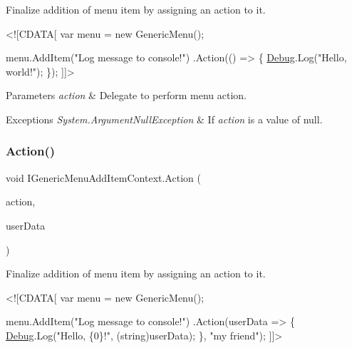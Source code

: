 Finalize addition of menu item by assigning an action to it. 


\begin{DoxyCode}
<![CDATA[
var menu = \textcolor{keyword}{new} GenericMenu();

menu.AddItem(\textcolor{stringliteral}{"Log message to console!"})
    .Action(() => \{
        \hyperlink{namespace_debug}{Debug}.Log(\textcolor{stringliteral}{"Hello, world!"});
    \});
]]>
\end{DoxyCode}
 


\begin{DoxyParams}{Parameters}
{\em action} & Delegate to perform menu action.\\
\hline
\end{DoxyParams}

\begin{DoxyExceptions}{Exceptions}
{\em System.\+Argument\+Null\+Exception} & If {\itshape action}  is a value of {\ttfamily null}. \\
\hline
\end{DoxyExceptions}
\mbox{\label{interface_i_generic_menu_add_item_context_ac880f540cc2f2cba3ec9f47a16f7742f}} 
\subsubsection{\texorpdfstring{Action()}{Action()}\hspace{0.1cm}{\footnotesize\ttfamily [2/2]}}
{\footnotesize\ttfamily void I\+Generic\+Menu\+Add\+Item\+Context.\+Action (\begin{DoxyParamCaption}\item[{Generic\+Menu.\+Menu\+Function2}]{action,  }\item[{object}]{user\+Data }\end{DoxyParamCaption})}



Finalize addition of menu item by assigning an action to it. 


\begin{DoxyCode}
<![CDATA[
var menu = \textcolor{keyword}{new} GenericMenu();

menu.AddItem(\textcolor{stringliteral}{"Log message to console!"})
    .Action(userData => \{
        \hyperlink{namespace_debug}{Debug}.Log(\textcolor{stringliteral}{"Hello, \{0\}!"}, (\textcolor{keywordtype}{string})userData);
    \}, \textcolor{stringliteral}{"my friend"});
]]>
\end{DoxyCode}
 


